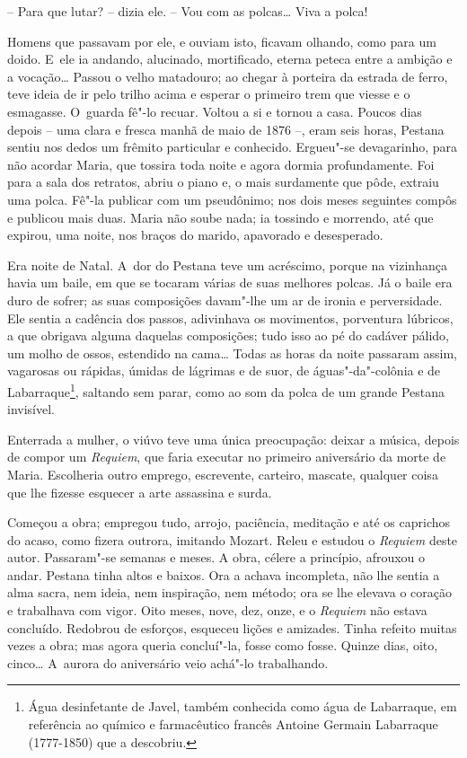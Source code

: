 -- Para que lutar? -- dizia ele. -- Vou com as polcas\ldots{} Viva a polca!

Homens que passavam por ele, e ouviam isto, ficavam olhando, como para
um doido. E~ele ia andando, alucinado, mortificado, eterna peteca entre
a ambição e a vocação\ldots{} Passou o velho matadouro; ao chegar à porteira
da estrada de ferro, teve ideia de ir pelo trilho acima e esperar o
primeiro trem que viesse e o esmagasse. O~guarda fê"-lo recuar. Voltou a
si e tornou a casa. Poucos dias depois -- uma clara e fresca manhã de
maio de 1876 --, eram seis horas, Pestana sentiu nos dedos um frêmito
particular e conhecido. Ergueu"-se devagarinho, para não acordar Maria,
que tossira toda noite e agora dormia profundamente. Foi para a sala dos
retratos, abriu o piano e, o mais surdamente que pôde, extraiu uma
polca. Fê"-la publicar com um pseudônimo; nos dois meses seguintes compôs
e publicou mais duas. Maria não soube nada; ia tossindo e morrendo, até
que expirou, uma noite, nos braços do marido, apavorado e desesperado.

Era noite de Natal. A~dor do Pestana teve um acréscimo, porque na
vizinhança havia um baile, em que se tocaram várias de suas melhores
polcas. Já o baile era duro de sofrer; as suas composições davam"-lhe um
ar de ironia e perversidade. Ele sentia a cadência dos passos,
adivinhava os movimentos, porventura lúbricos, a que obrigava alguma
daquelas composições; tudo isso ao pé do cadáver pálido, um molho de
ossos, estendido na cama\ldots{} Todas as horas da noite passaram assim,
vagarosas ou rápidas, úmidas de lágrimas e de suor, de águas"-da"-colônia
e de Labarraque\footnote{Água desinfetante de Javel, também conhecida
  como água de Labarraque, em referência ao químico e farmacêutico
  francês Antoine Germain Labarraque (1777-1850) que a descobriu.},
saltando sem parar, como ao som da polca de um grande Pestana invisível.

Enterrada a mulher, o viúvo teve uma única preocupação: deixar a música,
depois de compor um \emph{Requiem}, que faria executar no primeiro
aniversário da morte de Maria. Escolheria outro emprego, escrevente,
carteiro, mascate, qualquer coisa que lhe fizesse esquecer a arte
assassina e surda.

Começou a obra; empregou tudo, arrojo, paciência, meditação e até os
caprichos do acaso, como fizera outrora, imitando Mozart. Releu e
estudou o \emph{Requiem} deste autor. Passaram"-se semanas e meses. A
obra, célere a princípio, afrouxou o andar. Pestana tinha altos e
baixos. Ora a achava incompleta, não lhe sentia a alma sacra, nem ideia,
nem inspiração, nem método; ora se lhe elevava o coração e trabalhava
com vigor. Oito meses, nove, dez, onze, e o \emph{Requiem} não estava
concluído. Redobrou de esforços, esqueceu lições e amizades. Tinha
refeito muitas vezes a obra; mas agora queria concluí"-la, fosse como
fosse. Quinze dias, oito, cinco\ldots{} A~aurora do aniversário veio achá"-lo
trabalhando.

